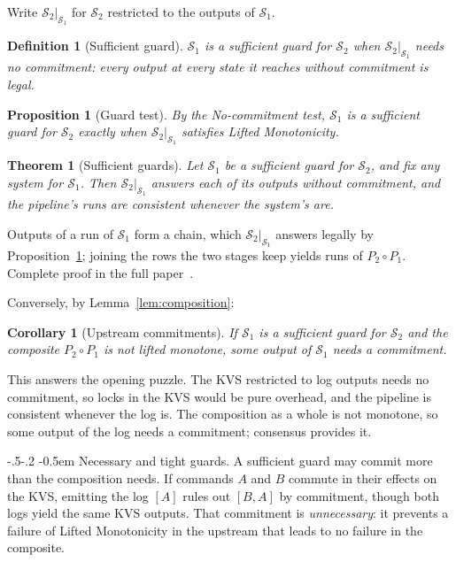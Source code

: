 \documentclass[sigconf]{cidr-2027}
\makeatletter
\newtheorem{theorem}{Theorem}
\newtheorem{proposition}{Proposition}
\newtheorem{corollary}{Corollary}
\newtheorem{definition}{Definition}
\theoremstyle{remark}
\renewcommand\paragraph{\@startsection{paragraph}{4}{\z@}%
  {-.5\baselineskip \@plus -2\p@ \@minus -.2\p@}%
  {-0.5em}%
  {\normalfont\bfseries}}
\newcommand{\commitment}{commitment\xspace}
\newcommand{\commitments}{commitments\xspace}
\newcommand{\Spec}{\mathcal{S}}
\newcommand{\fullproof}{Complete proof in the full paper~\cite{hellerstein2026completecalmfull}.}
\renewenvironment{proof}[1][\proofname]{\par
  \pushQED{\qed}\normalfont\topsep2\p@\relax
  \trivlist\item[\@proofindent\hskip\labelsep{\@proofnamefont #1\@addpunct{.}}]\ignorespaces
}{\popQED\endtrivlist\@endpefalse}
\makeatother
\begin{document}
Write $\Spec_2|_{\Spec_1}$ for $\Spec_2$ restricted to the outputs of
$\Spec_1$.

\begin{definition}[Sufficient guard]
\label{def:sufficient-guard}
$\Spec_1$ is a \emph{sufficient guard} for $\Spec_2$ when
$\Spec_2|_{\Spec_1}$ needs no \commitment: every output at every state it
reaches without \commitment is legal.
\end{definition}

\begin{proposition}[Guard test]
\label{prop:guard-test}
By the No-\commitment test, $\Spec_1$ is a sufficient guard for $\Spec_2$
exactly when $\Spec_2|_{\Spec_1}$ satisfies Lifted Monotonicity.
\end{proposition}

\begin{theorem}[Sufficient guards]
\label{thm:sufficient-guards}
Let $\Spec_1$ be a sufficient guard for $\Spec_2$, and fix any system for
$\Spec_1$.  Then
$\Spec_2|_{\Spec_1}$ answers each of its outputs without \commitment, and the
pipeline's runs are consistent whenever the system's are.
\end{theorem}
\begin{proof}[Proof sketch]
Outputs of a run of $\Spec_1$ form a chain, which $\Spec_2|_{\Spec_1}$
answers legally by Proposition~\ref{prop:guard-test}; joining the rows the
two stages keep yields runs of $P_2\circ P_1$.  \fullproof
\end{proof}

Conversely, by Lemma~\ref{lem:composition}:

\begin{corollary}[Upstream \commitments]
\label{cor:upstream-commitments}
If $\Spec_1$ is a sufficient guard for $\Spec_2$ and the composite
$P_2\circ P_1$ is not lifted monotone, some output of $\Spec_1$ needs a
\commitment.
\end{corollary}

This answers the opening puzzle.  The KVS restricted to log outputs needs no
\commitment, so locks in the KVS would be pure overhead, and the pipeline is
consistent whenever the log is.  The composition as a whole is not monotone, so some
output of the log needs a \commitment; consensus provides it.

\paragraph{Necessary and tight guards.}
A sufficient guard may commit more than the composition
needs.  If commands $A$ and $B$ commute in their effects on the KVS,
emitting the log $[A]$ rules out $[B,A]$ by \commitment, though both logs
yield the same KVS outputs.  That \commitment is \emph{unnecessary}: it prevents a
failure of Lifted Monotonicity in the upstream that leads to no failure in the
composite.
\end{document}
